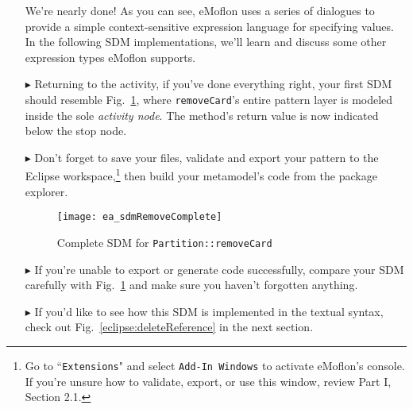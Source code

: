 \begin{itemize}
\vspace{0.5cm}

We're nearly done! As you can see, eMoflon uses a series of dialogues to provide a simple context-sensitive expression language for specifying  values. In the
following SDM implementations, we'll learn and discuss some other expression types eMoflon supports.

\vspace{0.5cm}

\item[$\blacktriangleright$] Returning to the activity, if you've done everything right, your first SDM should resemble
Fig.~\ref{ea:sdm_complete_control_flow}, where \texttt{removeCard}'s entire pattern layer is modeled inside the sole \emph{activity node}. The method's return
value is now indicated below the stop node.

\vspace{0.5cm}

\item[$\blacktriangleright$]  Don't forget to save your files, validate and export your pattern to the Eclipse workspace,\footnote{Go to
``\texttt{Extensions}" and select \texttt{Add-In Windows} to activate eMoflon's console. If you're unsure how to validate, export, or use this window, review
Part I, Section 2.1.} then build your metamodel's code from the package explorer.

\newpage

\begin{figure}[htbp]
\begin{center}
  \texttt{[image: ea\_sdmRemoveComplete]}
  \caption{Complete SDM for \texttt{Partition::removeCard}}  
  \label{ea:sdm_complete_control_flow}
\end{center}
\end{figure}

\item[$\blacktriangleright$] If you're unable to export or generate code successfully, compare your SDM carefully with Fig.~\ref{ea:sdm_complete_control_flow}
and make sure you haven't forgotten anything.

\vspace{0.5cm}

\item[$\blacktriangleright$] If you'd like to see how this SDM is implemented in the textual syntax, check out Fig.~\ref{eclipse:deleteReference} in the
next section.


\end{itemize}

